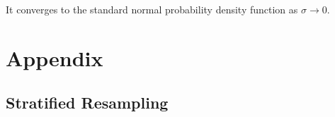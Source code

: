 \documentclass[11pt,a4,twosided,singlespacing,titlepagenumber=on]{scrreprt}
\numberwithin{equation}{chapter} %
\theoremstyle{remark}
\begin{document}
It converges to the standard normal probability density function as $\sigma \rightarrow 0$.


\cleardoublepage
{}
{} %



\chapter{Appendix}

\section{Stratified Resampling}

\end{document}
